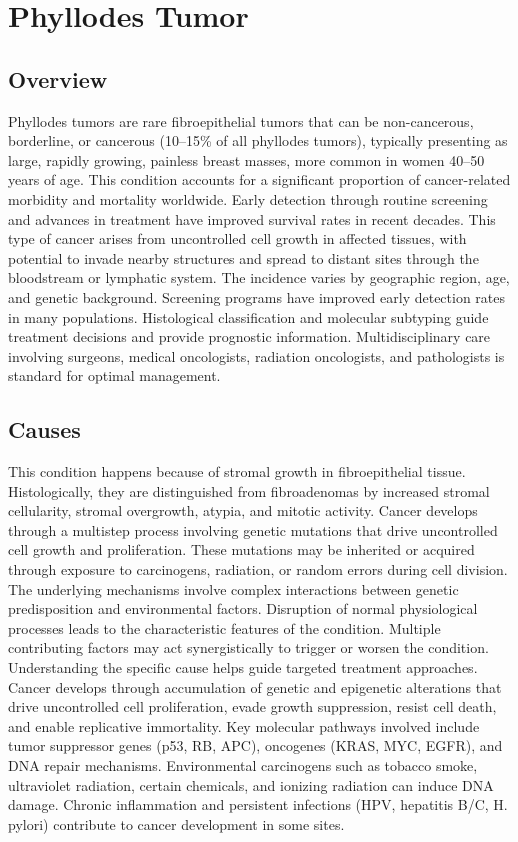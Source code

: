 \chapter{Phyllodes Tumor}
\label{sec:Phyllodes Tumor}

\section{Overview}
Phyllodes tumors are rare fibroepithelial tumors that can be non-cancerous, borderline, or cancerous (10--15\% of all phyllodes tumors), typically presenting as large, rapidly growing, painless breast masses, more common in women 40--50 years of age. This condition accounts for a significant proportion of cancer-related morbidity and mortality worldwide. Early detection through routine screening and advances in treatment have improved survival rates in recent decades. This type of cancer arises from uncontrolled cell growth in affected tissues, with potential to invade nearby structures and spread to distant sites through the bloodstream or lymphatic system. The incidence varies by geographic region, age, and genetic background. Screening programs have improved early detection rates in many populations. Histological classification and molecular subtyping guide treatment decisions and provide prognostic information. Multidisciplinary care involving surgeons, medical oncologists, radiation oncologists, and pathologists is standard for optimal management.
\section{Causes}
This condition happens because of stromal growth in fibroepithelial tissue. Histologically, they are distinguished from fibroadenomas by increased stromal cellularity, stromal overgrowth, atypia, and mitotic activity. Cancer develops through a multistep process involving genetic mutations that drive uncontrolled cell growth and proliferation. These mutations may be inherited or acquired through exposure to carcinogens, radiation, or random errors during cell division. The underlying mechanisms involve complex interactions between genetic predisposition and environmental factors. Disruption of normal physiological processes leads to the characteristic features of the condition. Multiple contributing factors may act synergistically to trigger or worsen the condition. Understanding the specific cause helps guide targeted treatment approaches. Cancer develops through accumulation of genetic and epigenetic alterations that drive uncontrolled cell proliferation, evade growth suppression, resist cell death, and enable replicative immortality. Key molecular pathways involved include tumor suppressor genes (p53, RB, APC), oncogenes (KRAS, MYC, EGFR), and DNA repair mechanisms. Environmental carcinogens such as tobacco smoke, ultraviolet radiation, certain chemicals, and ionizing radiation can induce DNA damage. Chronic inflammation and persistent infections (HPV, hepatitis B/C, H. pylori) contribute to cancer development in some sites.
